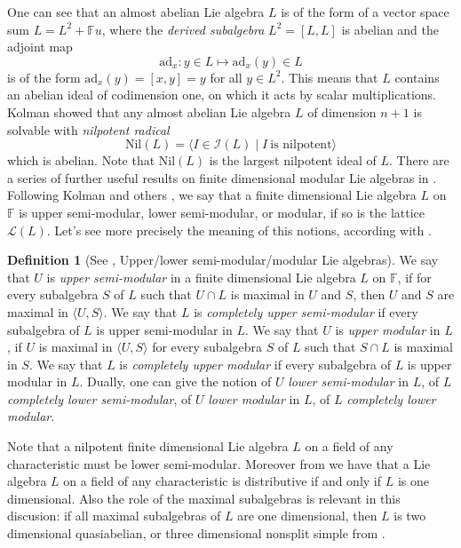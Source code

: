 \documentclass{amsart}
\theoremstyle{definition}
\newtheorem{definition}[theorem]{Definition}
\numberwithin{equation}{section}
\begin{document}
One can see that an almost abelian Lie algebra $L$ is of the form of a vector space sum  $L=L^2 + \mathbb{F}u$, where the \textit{derived subalgebra} $L^2 =[L, L]$ is abelian and the adjoint map \[\mathrm{ad}_x : y \in L \mapsto \mathrm{ad}_x(y) \in L\] is of the form $\mathrm{ad}_x(y)=[x,y]=y $ for all $y\in L^2$. This  means that $L$ contains an abelian ideal of codimension one, on which it acts by scalar multiplications. Kolman \cite [Proposition 1.1]{kolman1965} showed that  any   almost abelian Lie algebra $L$ of dimension $n+1$ is solvable with  \textit{nilpotent radical} 
$$\mathrm{Nil}(L)=\langle I \in \mathcal{I}(L) \mid I \ \mbox{is nilpotent}\rangle$$
which is  abelian. Note that $\mathrm{Nil}(L)$ is the  largest nilpotent ideal of $L$. There are a series of further useful results on finite dimensional modular Lie algebras in \cite{kolman1965}.  Following Kolman and others \cite{bowman2004, elduque1, elduque2, kolman1965, lashi, david1981}, we say that  a finite dimensional Lie algebra $L$ on $\mathbb{F}$ is upper semi-modular, lower semi-modular, or modular, if so is the lattice $\mathcal{L}(L)$.      Let's see more precisely the meaning of this notions, according with \cite{boto,  gein, kolman1965}. 

\begin{definition}[See \cite{boto, gein, kolman1965}, Upper/lower semi-modular/modular Lie algebras] \label{uls}
We say that  $U$ is \textit{upper semi-modular} in a finite dimensional Lie algebra $L$ on $\mathbb{F}$,  if for every subalgebra $S$ of $L$ such that $U \cap L$ is maximal in $U$ and $S$, then $U$ and $S$ are maximal in $\langle U, S \rangle$. We say that $L$ is \textit{completely upper semi-modular} if every subalgebra of $L$ is upper semi-modular in $L$. We say that $U$ is \textit{upper modular} in $L$, if $U$ is maximal in $\langle U, S \rangle$ for every subalgebra $S$ of $L$ such that $S\cap L$ is maximal in $S$. We say that $L$ is \textit{completely upper modular} if every subalgebra of $L$ is upper modular in $L$. Dually,  one can give the notion of  $U$  \textit{lower semi-modular} in $L$,  %
of $L$  \textit{completely lower semi-modular},  %
of $U$ \textit{lower modular} in $L$, of $L$ \textit{completely lower modular}.
\end{definition}

Note  that a nilpotent finite dimensional Lie algebra $L$ on a field of any characteristic must be lower semi-modular.   Moreover from \cite{kolman1965} we have that a Lie algebra $L$ on a field of any characteristic is distributive if and only if $L$ is one dimensional.  Also the role of the maximal subalgebras is relevant in this discusion: if all maximal subalgebras of $L$ are one dimensional, then $L$ is two dimensional quasiabelian, or three dimensional  nonsplit simple from \cite[Lemma 5.8]{boto}.  
\end{document}
